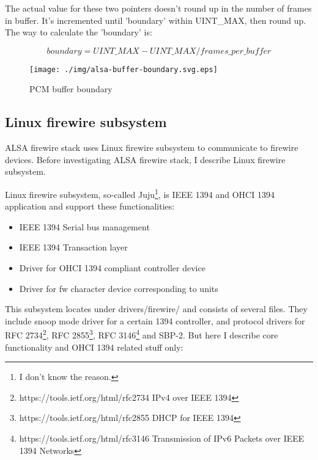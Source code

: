 \documentclass[onecolumn]{article}
\begin{document}
The actual value for these two pointers doesn't round up in the number of frames in buffer. It's incremented until 'boundary' within UINT\_MAX, then round up. The way to calculate the 'boundary' is:

\begin{equation}
boundary = UINT\_MAX - UINT\_MAX / frames\_per\_buffer 
\end{equation}

\begin{figure}[H]
	\centering
	\texttt{[image: ./img/alsa-buffer-boundary.svg.eps]}
	\caption{{PCM buffer boundary}}
	\label{alsa--buffer-boundary}
\end{figure}


\subsection{Linux firewire subsystem}

ALSA firewire stack uses Linux firewire subsystem to communicate to firewire devices. Before investigating ALSA firewire stack, I describe Linux firewire subsystem.

Linux firewire subsystem, so-called Juju\footnote{I don't know the reason.}, is IEEE 1394 and OHCI 1394 application and support these functionalities:

\begin{itemize}
\small
\item IEEE 1394 Serial bus management
\item IEEE 1394 Transaction layer
\item Driver for OHCI 1394 compliant controller device
\item Driver for fw character device corresponding to units
\end{itemize}

This subsystem locates under drivers/firewire/ and consists of several files. They include snoop mode driver for a certain 1394 controller, and protocol drivers for RFC 2734\footnote{https://tools.ietf.org/html/rfc2734 IPv4 over IEEE 1394}, RFC 2855\footnote{https://tools.ietf.org/html/rfc2855 DHCP for IEEE 1394}, RFC 3146\footnote{https://tools.ietf.org/html/rfc3146 Transmission of IPv6 Packets over IEEE 1394 Networks } and SBP-2. But here I describe core functionality and OHCI 1394 related stuff only:
\end{document}
